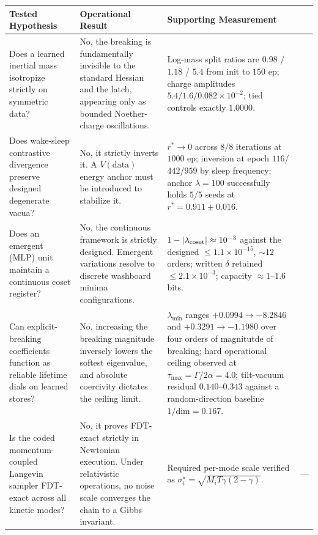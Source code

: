 \documentclass{article}
\begin{document}
\begin{center}
\begin{tabular}{@{}p{1.52in} p{1.52in} p{2.06in}@{}}
\toprule
Tested Hypothesis & Operational Result & Supporting Measurement \\
\midrule
Does a learned inertial mass isotropize strictly on symmetric data? &
No, the breaking is fundamentally invisible to the standard Hessian and the latch, appearing only as bounded Noether-charge oscillations. &
Log-mass split ratios are $0.98$ / $1.18$ / $5.4$ from init to $150$ ep; charge amplitudes $5.4/1.6/0.082{\times}10^{-2}$; tied controls exactly $1.0000$. \\[2pt]
Does wake-sleep contrastive divergence preserve designed degenerate vacua? &
No, it strictly inverts it. A $V(\text{data})$ energy anchor must be introduced to stabilize it. &
$r^*\to0$ across $8/8$ iterations at $1000$ ep; inversion at epoch $116$/$442$/$959$ by sleep frequency; anchor $\lambda{=}100$ successfully holds $5/5$ seeds at $r^*{=}0.911\pm0.016$. \\[2pt]
Does an emergent (MLP) unit maintain a continuous coset register? &
No, the continuous framework is strictly designed. Emergent variations resolve to discrete washboard minima configurations. &
$1-|\lambda_{\rm coset}|\approx10^{-3}$ against the designed $\le1.1{\times}10^{-15}$, $\sim\!12$ orders; written $\delta$ retained $\le2.1{\times}10^{-3}$; capacity $\approx1$--$1.6$ bits. \\[2pt]
Can explicit-breaking coefficients function as reliable lifetime dials on learned stores? &
No, increasing the breaking magnitude inversely lowers the softest eigenvalue, and absolute coercivity dictates the ceiling limit. &
$\lambda_{\min}$ ranges $+0.0994\to-8.2846$ and $+0.3291\to-1.1980$ over four orders of magnitutde of breaking; hard operational ceiling observed at $\tau_{\max}=\Gamma/2\alpha=4.0$; tilt-vacuum residual $0.140$--$0.343$ against a random-direction baseline $1/\mathrm{dim}=0.167$. \\[2pt]
Is the coded momentum-coupled Langevin sampler FDT-exact across all kinetic modes? &
No, it proves FDT-exact strictly in Newtonian execution. Under relativistic operations, no noise scale converges the chain to a Gibbs invariant. &
Required per-mode scale verified as $\sigma^\star_i=\sqrt{M_iT\gamma(2-\gamma)}$. &
--- \\[2pt]
\bottomrule
\end{tabular}
\end{center}
\end{document}
